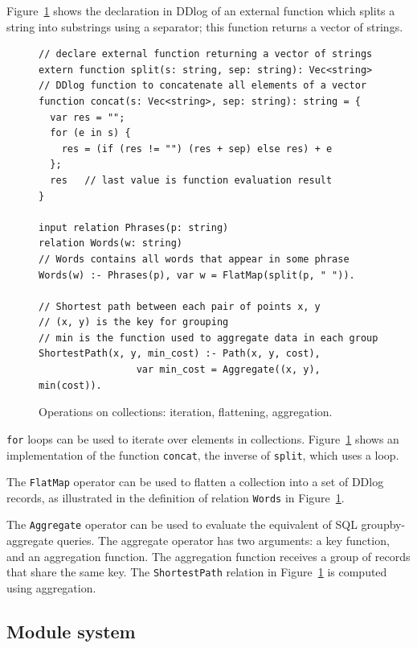 Figure~\ref{fig:collections} shows the declaration in DDlog of an
external function which splits a string into substrings using a
separator; this function returns a vector of strings.

\begin{figure}[t]
  \footnotesize
  \begin{lstlisting}[language=ddlog]
// declare external function returning a vector of strings
extern function split(s: string, sep: string): Vec<string>
// DDlog function to concatenate all elements of a vector
function concat(s: Vec<string>, sep: string): string = {
  var res = "";
  for (e in s) {
    res = (if (res != "") (res + sep) else res) + e
  };
  res   // last value is function evaluation result
}

input relation Phrases(p: string)
relation Words(w: string)
// Words contains all words that appear in some phrase
Words(w) :- Phrases(p), var w = FlatMap(split(p, " ")).

// Shortest path between each pair of points x, y
// (x, y) is the key for grouping
// min is the function used to aggregate data in each group
ShortestPath(x, y, min_cost) :- Path(x, y, cost),
                 var min_cost = Aggregate((x, y), min(cost)).
\end{lstlisting}
\caption{Operations on collections: iteration, flattening,
  aggregation.\label{fig:collections}}
\end{figure}

\texttt{for} loops can be used to iterate over elements in
collections.  Figure~\ref{fig:collections} shows an implementation of
the function \texttt{concat}, the inverse of \texttt{split}, which
uses a loop.

The \texttt{FlatMap} operator can be used to flatten
a collection into a set of DDlog records, as illustrated in the definition of
relation \texttt{Words} in Figure~\ref{fig:collections}.

The \texttt{Aggregate} operator can be used to evaluate the equivalent
of SQL groupby-aggregate queries.  The aggregate operator has two
arguments: a key function, and an aggregation function.  The
aggregation function receives a group of
records that share the same key.  The
\texttt{ShortestPath} relation in Figure~\ref{fig:collections} is
computed using aggregation.

\subsection{Module system}

